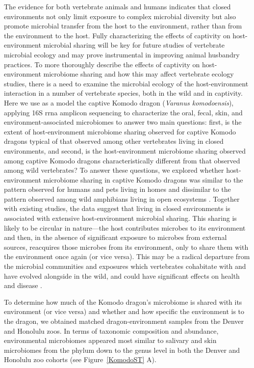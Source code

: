 The evidence for both vertebrate animals and humans indicates that closed
environments not only limit exposure to complex microbial diversity but also
promote microbial transfer from the host to the environment, rather than from
the environment to the host. Fully characterizing the effects of captivity on
host-environment microbial sharing will be key for future studies of vertebrate
microbial ecology and may prove instrumental in improving animal husbandry
practices. To more thoroughly describe the effects of captivity on host-environment
microbiome sharing and how this may affect vertebrate ecology studies, there is a
need to examine the microbial ecology of the host-environment interaction in a
number of vertebrate species, both in the wild and in captivity. Here we use as
a model the captive Komodo dragon (\emph{Varanus komodoensis}), applying 16S \gls{rrna}
amplicon sequencing to characterize the oral, fecal, skin, and environment-associated
microbiomes to answer two main questions: first, is the extent of host-environment
microbiome sharing observed for captive Komodo dragons typical of that observed
among other vertebrates living in closed environments, and second, is the
host-environment microbiome sharing observed among captive Komodo dragons
characteristically different from that observed among wild vertebrates? To
answer these questions, we explored whether host-environment microbiome sharing
in captive Komodo dragons was similar to the pattern observed for humans and pets
living in homes \cite{Lax2014} and dissimilar to the pattern observed among wild amphibians
living in open ecosystems \cite{Kueneman2014}. Together with existing studies, the data suggest that
living in closed environments is associated with extensive host-environment microbial
sharing. This sharing is likely to be circular in nature—the host contributes
microbes to its environment and then, in the absence of significant exposure to
microbes from external sources, reacquires those microbes from its environment,
only to share them with the environment once again (or vice versa). This may be
a radical departure from the microbial communities and exposures which vertebrates
cohabitate with and have evolved alongside in the wild, and could have significant
effects on health and disease \cite{Lax2015}.

To determine how much of the Komodo dragon's microbiome is shared with its environment
(or vice versa) and whether and how specific the environment is to the dragon, we
obtained matched dragon-environment samples from the Denver and Honolulu zoos. In
terms of taxonomic composition and abundance, environmental microbiomes appeared most
similar to salivary and skin microbiomes from the phylum down to the genus level
in both the Denver and Honolulu zoo cohorts (see Figure~\ref{KomodoST} A).

